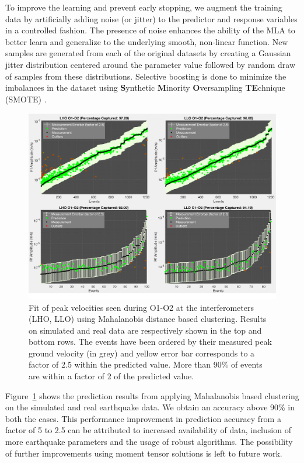 \documentclass[preprint, aps, showpacs]{revtex4-1}
\begin{document}
To improve the learning and prevent early stopping, we augment the training data by artificially adding noise (or jitter) to the predictor and response variables in a controlled fashion. The presence of noise enhances the ability of the MLA to better learn and generalize to the underlying smooth, non-linear function. New samples are generated from each of the original datasets by creating a Gaussian jitter distribution centered around the parameter value followed by random draw of samples from these distributions. Selective boosting is done to minimize the imbalances in the dataset using \textbf{S}ynthetic \textbf{M}inority \textbf{O}versampling \textbf{TE}chnique (SMOTE) \cite{ChBo2011}. 

\begin{figure}[!htb]
\hspace*{-0.5cm}
 \includegraphics[width=\textwidth]{./plots/ClusteringPrediction.pdf}
 \caption{Fit of peak velocities seen during O1-O2 at the interferometers (LHO, LLO) using Mahalanobis distance based clustering. Results on simulated and real data are respectively shown in the top and bottom rows. The events have been ordered by their measured peak ground velocity (in grey) and yellow error bar corresponds to a factor of 2.5 within the predicted value. More than 90\% of events are within a factor of 2 of the predicted value.}
 \label{fig:regression}
\end{figure}

Figure~\ref{fig:regression} shows the prediction results from applying Mahalanobis based clustering on the simulated and real earthquake data. We obtain an accuracy above 90\% in both the cases. This performance improvement in prediction accuracy from a factor of 5 to 2.5 can be attributed to increased availability of data, inclusion of more earthquake parameters and the usage of robust algorithms. The possibility of further improvements using moment tensor solutions is left to future work.
\end{document}
